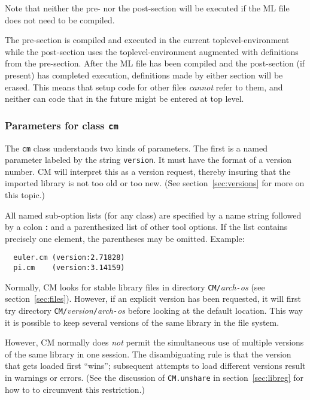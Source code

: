\documentclass[titlepage,letterpaper]{article}
\begin{document}
\noindent Note that neither the pre- nor the post-section will be
executed if the ML file does not need to be compiled.

The pre-section is compiled and executed in the current
toplevel-environment while the post-section uses the
toplevel-environment augmented with definitions from the pre-section.
After the ML file has been compiled and the post-section (if present)
has completed execution, definitions made by either section will be
erased.  This means that setup code for other files {\em cannot} refer
to them, and neither can code that in the future might be entered at
top level.

\subsubsection{Parameters for class {\tt cm}}
\label{sec:toolparam:cm}

The {\tt cm} class understands two kinds of parameters.  The first is
a named parameter labeled by the string {\tt version}.  It must have
the format of a version number.  CM will interpret this as a version
request, thereby insuring that the imported library is not too old or
too new. (See section~\ref{sec:versions} for more on this topic.)

All named sub-option lists (for any class) are specified by a name
string followed by a colon {\bf :} and a parenthesized list of other
tool options.  If the list contains precisely one element, the
parentheses may be omitted.  Example:

\begin{verbatim}
  euler.cm (version:2.71828)
  pi.cm    (version:3.14159)
\end{verbatim}

Normally, CM looks for stable library files in directory
{\tt CM/}{\it arch}{\tt -}{\it os} (see section~\ref{sec:files}).
However, if an explicit version has been requested, it will first try
directory {\tt CM/}{\it version}{\tt /}{\it arch}{\tt -}{\it os}
before looking at the default location.  This way it is possible to
keep several versions of the same library in the file system.

However, CM normally does {\em not} permit the simultaneous use of
multiple versions of the same library in one session.  The
disambiguating rule is that the version that gets loaded first
``wins''; subsequent attempts to load different versions result in
warnings or errors.  (See the discussion of {\tt CM.unshare} in
section~\ref{sec:libreg} for how to to circumvent this restriction.)
\end{document}
